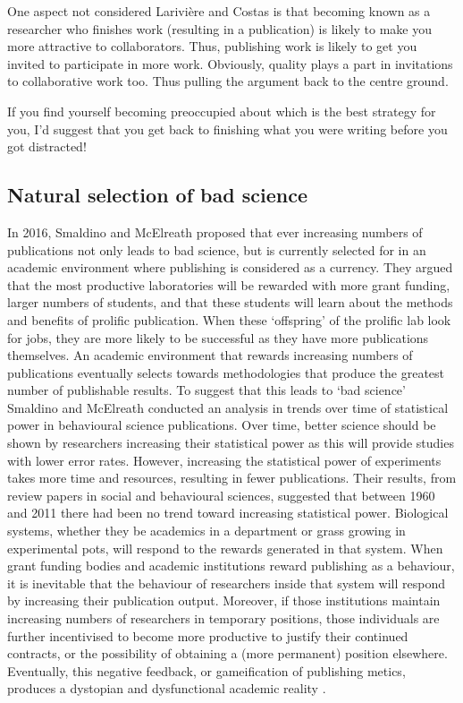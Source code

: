 \documentclass[
]{krantz}
\begin{document}
One aspect not considered Larivière and Costas \citeyearpar{lariviere2016how} is that becoming known as a researcher who finishes work (resulting in a publication) is likely to make you more attractive to collaborators. Thus, publishing work is likely to get you invited to participate in more work. Obviously, quality plays a part in invitations to collaborative work too. Thus pulling the argument back to the centre ground.

If you find yourself becoming preoccupied about which is the best strategy for you, I'd suggest that you get back to finishing what you were writing before you got distracted!

\hypertarget{natural-selection-of-bad-science}{%
\subsection{Natural selection of bad science}\label{natural-selection-of-bad-science}}

In 2016, Smaldino and McElreath proposed that ever increasing numbers of publications not only leads to bad science, but is currently selected for in an academic environment where publishing is considered as a currency. They argued that the most productive laboratories will be rewarded with more grant funding, larger numbers of students, and that these students will learn about the methods and benefits of prolific publication. When these `offspring' of the prolific lab look for jobs, they are more likely to be successful as they have more publications themselves. An academic environment that rewards increasing numbers of publications eventually selects towards methodologies that produce the greatest number of publishable results. To suggest that this leads to `bad science' Smaldino and McElreath \citeyearpar{smaldino2016natural} conducted an analysis in trends over time of statistical power in behavioural science publications. Over time, better science should be shown by researchers increasing their statistical power as this will provide studies with lower error rates. However, increasing the statistical power of experiments takes more time and resources, resulting in fewer publications. Their results, from review papers in social and behavioural sciences, suggested that between 1960 and 2011 there had been no trend toward increasing statistical power. Biological systems, whether they be academics in a department or grass growing in experimental pots, will respond to the rewards generated in that system. When grant funding bodies and academic institutions reward publishing as a behaviour, it is inevitable that the behaviour of researchers inside that system will respond by increasing their publication output. Moreover, if those institutions maintain increasing numbers of researchers in temporary positions, those individuals are further incentivised to become more productive to justify their continued contracts, or the possibility of obtaining a (more permanent) position elsewhere. Eventually, this negative feedback, or gameification of publishing metics, produces a dystopian and dysfunctional academic reality \citep{helmer2020what}.
\end{document}
